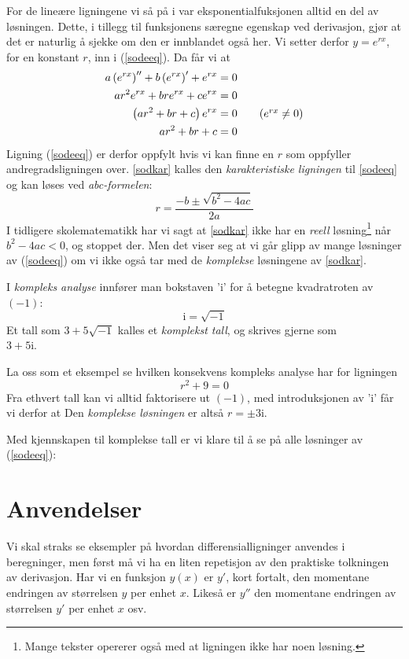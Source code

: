For de lineære ligningene vi så på i  var eksponentialfuksjonen alltid en del av løsningen. Dette, i tillegg til funksjonens særegne egenskap ved derivasjon, gjør at det er naturlig å sjekke om den er innblandet også her. Vi setter derfor $ {y=e^{rx} }$, for en konstant $ r $, inn i (\ref{sodeeq}). Da får vi at
\begin{align}
	a\left(e^{rx}\right)''+b\left(e^{rx}\right)'+ e^{rx} &= 0\nonumber \\
	ar^2e^{rx}+ bre^{rx} + ce^{rx}&= 0\nonumber\\
	\left(ar^2 + br + c\right)e^{rx} &= 0 \tag{$ e^{rx}\neq 0 $}\nonumber \\
	ar^2 + br + c &= 0 \label{sodkar}
\end{align}
Ligning (\ref{sodeeq}) er derfor oppfylt hvis vi kan finne en $ r $ som oppfyller andregradsligningen over. \eqref{sodkar} kalles den \textit{karakteristiske ligningen} til \eqref{sodeeq} og kan løses ved \textit{abc-formelen}:
\[ r = \frac{-b\pm\sqrt{b^2-4ac}}{2a} \]
I tidligere skolematematikk har vi sagt at \eqref{sodkar} ikke har en \textit{reell} løsning\footnote{Mange tekster opererer også med at ligningen ikke har noen løsning.}\label{rkmpstart} når  ${ b^2-4ac<0 }$, og stoppet der. Men det viser seg at vi går glipp av mange løsninger av (\ref{sodeeq}) om vi ikke også tar med de \textit{komplekse} løsningene av \eqref{sodkar}.\vsk

I \textit{kompleks analyse} innfører man bokstaven 'i' for å betegne kvadratroten av $( -1) $:
\[ \mathrm{i}=\sqrt{-1} \]
Et tall som $ 3+5\sqrt{-1} $ kalles et \textit{komplekst tall}, og skrives gjerne som \\$ 3+5\mathrm{i} $.\vsk

La oss som et eksempel se hvilken konsekvens kompleks analyse har for ligningen
\[ r^2 +9 = 0  \]
Fra ethvert tall kan vi alltid faktorisere ut $ (-1) $, med introduksjonen av 'i' får vi derfor at
Den \textit{komplekse løsningen} er altså $ r=\pm 3\mathrm{i} $.\vsk

Med kjennskapen til komplekse tall er vi klare til å se på alle løsninger av (\ref{sodeeq}):
\sode
\sodee
\sodeeto
\sodeetre
\section{Anvendelser}
Vi skal straks se eksempler på hvordan differensialligninger anvendes i beregninger, men først må vi ha en liten repetisjon av den praktiske tolkningen av derivasjon. Har vi en funksjon $ y(x) $ er $ y' $, kort fortalt, den momentane endringen av størrelsen $ y $ per enhet $ x $. Likeså er $ y'' $ den momentane endringen av størrelsen $ y' $ per enhet $ x $ osv.\vsk

